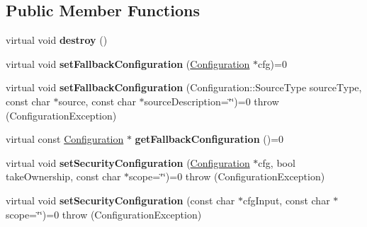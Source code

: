 \subsection*{Public Member Functions}
\begin{DoxyCompactItemize}
\item 
\hypertarget{classCONFIG4CPP__NAMESPACE_1_1Configuration_a6b4d9a5b754f030613092e8238ada051}{virtual void {\bfseries destroy} ()}\label{classCONFIG4CPP__NAMESPACE_1_1Configuration_a6b4d9a5b754f030613092e8238ada051}

\item 
\hypertarget{classCONFIG4CPP__NAMESPACE_1_1Configuration_a4ee48cc141113b59c7cdbd684f6f6280}{virtual void {\bfseries set\-Fallback\-Configuration} (\hyperlink{classCONFIG4CPP__NAMESPACE_1_1Configuration}{Configuration} $\ast$cfg)=0}\label{classCONFIG4CPP__NAMESPACE_1_1Configuration_a4ee48cc141113b59c7cdbd684f6f6280}

\item 
\hypertarget{classCONFIG4CPP__NAMESPACE_1_1Configuration_acdabd2bcec65531f37749d05d88bacf0}{virtual void {\bfseries set\-Fallback\-Configuration} (Configuration\-::\-Source\-Type source\-Type, const char $\ast$source, const char $\ast$source\-Description=\char`\"{}\char`\"{})=0  throw (\-Configuration\-Exception)}\label{classCONFIG4CPP__NAMESPACE_1_1Configuration_acdabd2bcec65531f37749d05d88bacf0}

\item 
\hypertarget{classCONFIG4CPP__NAMESPACE_1_1Configuration_a74eb6b4c18c63a6ed458b5d115942908}{virtual const \hyperlink{classCONFIG4CPP__NAMESPACE_1_1Configuration}{Configuration} $\ast$ {\bfseries get\-Fallback\-Configuration} ()=0}\label{classCONFIG4CPP__NAMESPACE_1_1Configuration_a74eb6b4c18c63a6ed458b5d115942908}

\item 
\hypertarget{classCONFIG4CPP__NAMESPACE_1_1Configuration_a10a398ed7d0eb8b331fea8fc64c32679}{virtual void {\bfseries set\-Security\-Configuration} (\hyperlink{classCONFIG4CPP__NAMESPACE_1_1Configuration}{Configuration} $\ast$cfg, bool take\-Ownership, const char $\ast$scope=\char`\"{}\char`\"{})=0  throw (\-Configuration\-Exception)}\label{classCONFIG4CPP__NAMESPACE_1_1Configuration_a10a398ed7d0eb8b331fea8fc64c32679}

\item 
\hypertarget{classCONFIG4CPP__NAMESPACE_1_1Configuration_a7169b8486ab3b27e1d0c76c44dc41025}{virtual void {\bfseries set\-Security\-Configuration} (const char $\ast$cfg\-Input, const char $\ast$scope=\char`\"{}\char`\"{})=0  throw (\-Configuration\-Exception)}\label{classCONFIG4CPP__NAMESPACE_1_1Configuration_a7169b8486ab3b27e1d0c76c44dc41025}


\end{DoxyCompactItemize}
